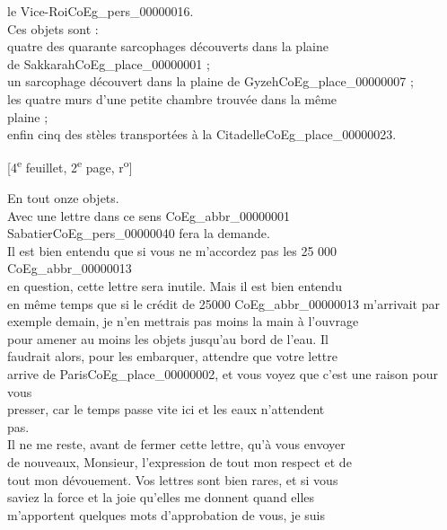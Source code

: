 \documentclass{book}
\begin{document}
le Vice-Roi\gls{CoEg_pers_00000016}.\\
\indent Ces objets sont :\\
\indent quatre des quarante sarcophages découverts dans la plaine\\
de Sakkarah\gls{CoEg_place_00000001} ;\\
\indent un sarcophage découvert dans la plaine de Gyzeh\gls{CoEg_place_00000007} ;\\
\indent les quatre murs d’une petite chambre trouvée dans la même\\
plaine ;\\
\indent enfin cinq des stèles transportées à la Citadelle\gls{CoEg_place_00000023}.
{\footnotesize\begin{center} {[4\textsuperscript{e} feuillet, 2\textsuperscript{e} page, r\textsuperscript{o}]}\end{center}}
\indent En tout onze objets.\\
\indent Avec une lettre dans ce sens \gls{CoEg_abbr_00000001} Sabatier\gls{CoEg_pers_00000040} fera la demande.\\
\indent Il est bien entendu que si vous ne m’accordez pas les 25 000 \gls{CoEg_abbr_00000013}\\
en question, cette lettre sera inutile. Mais il est bien entendu\\
en même temps que si le crédit de 25000 \gls{CoEg_abbr_00000013} m’arrivait par\\
exemple demain, je n’en mettrais pas moins la main à l’ouvrage\\
pour amener au moins les objets jusqu’au bord de l’eau. Il\\
faudrait alors, pour les embarquer, attendre que votre lettre\\
arrive de Paris\gls{CoEg_place_00000002}, et vous voyez que c’est une raison pour vous\\
presser, car le temps passe vite ici et les eaux n’attendent\\
pas.\\
\indent Il ne me reste, avant de fermer cette lettre, qu’à vous envoyer\\
de nouveaux, Monsieur, l’expression de tout mon respect et de\\
tout mon dévouement. Vos lettres sont bien rares, et si vous\\
saviez la force et la joie qu’elles me donnent quand elles\\
m’apportent quelques mots d’approbation de vous, je suis\\
\end{document}
